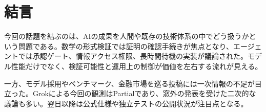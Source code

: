 \section{結言}
今回の話題を結ぶのは、AIの成果を人間や既存の技術体系の中でどう扱うかという問題である。数学の形式検証では証明の確認手続きが焦点となり、エージェントでは承認ゲート、情報アクセス権限、長時間待機の実装が議論された。モデル性能だけでなく、検証可能性と運用上の制御が価値を左右する流れが見える。

一方、モデル採用やベンチマーク、金融市場を巡る投稿には一次情報の不足が目立った。Grokによる今回の観測はPartialであり、窓外の発表を受けた二次的な議論も多い。翌日以降は公式仕様や独立テストの公開状況が注目点となる。
